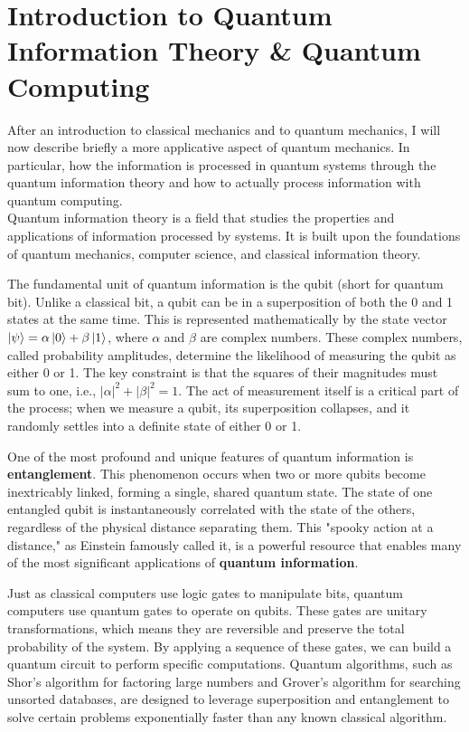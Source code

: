 \documentclass{article}
\begin{document}
\section{Introduction to Quantum Information Theory \& Quantum Computing}
After an introduction to classical mechanics and to quantum mechanics, I will now describe briefly a more applicative aspect of quantum mechanics. In particular, how the information is processed in quantum systems through the quantum information theory and how to actually process information with quantum computing.\\
Quantum information theory is a field that studies the properties and applications of information processed by systems. It is built upon the foundations of quantum mechanics, computer science, and classical information theory.

The fundamental unit of quantum information is the qubit (short for quantum bit). Unlike a classical bit, a qubit can be in a superposition of both the 0 and 1 states at the same time. This is represented mathematically by the state vector $\ket{\psi}=\alpha \ket{0} + \beta \ket{1}$, where $\alpha$ and $\beta$ are complex numbers. These complex numbers, called probability amplitudes, determine the likelihood of measuring the qubit as either 0 or 1. The key constraint is that the squares of their magnitudes must sum to one, i.e., $|\alpha|^2 + |\beta|^2 = 1$. The act of measurement itself is a critical part of the process; when we measure a qubit, its superposition collapses, and it randomly settles into a definite state of either 0 or 1.

One of the most profound and unique features of quantum information is \textbf{entanglement}. This phenomenon occurs when two or more qubits become inextricably linked, forming a single, shared quantum state. The state of one entangled qubit is instantaneously correlated with the state of the others, regardless of the physical distance separating them. This "spooky action at a distance," as Einstein famously called it, is a powerful resource that enables many of the most significant applications of \textbf{quantum information}.

Just as classical computers use logic gates to manipulate bits, quantum computers use quantum gates to operate on qubits. These gates are unitary transformations, which means they are reversible and preserve the total probability of the system. By applying a sequence of these gates, we can build a quantum circuit to perform specific computations. Quantum algorithms, such as Shor's algorithm for factoring large numbers and Grover's algorithm for searching unsorted databases, are designed to leverage superposition and entanglement to solve certain problems exponentially faster than any known classical algorithm.
\end{document}
